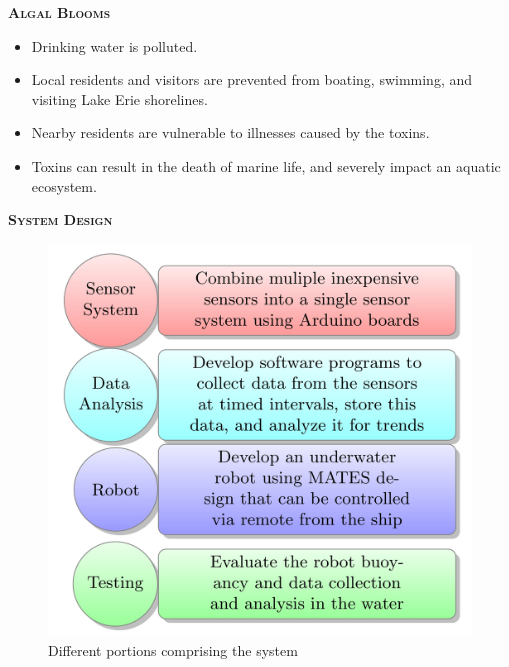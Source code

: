\documentclass[final,t]{beamer}
\begin{document}
\begin{frame}{}
\begin{columns}
\begin{column}{.5\linewidth}
\begin{block}{\textsc{\textbf{Algal Blooms}}}
                \begin{itemize}
               		\item Drinking water is polluted.
					\item Local residents and visitors are prevented from boating, swimming,
          and visiting Lake Erie shorelines.
					\item Nearby residents are vulnerable to illnesses caused by the toxins.
					\item Toxins can result in the death of marine life, and severely impact
          an aquatic ecosystem.
				\end{itemize}
                    \vspace*{3mm}
                \end{block}
                \begin{alertblock}{\textsc{\textbf{System Design}}}
					   \begin{figure}
                    		\includegraphics[scale = 3.84]{assets/diagram.jpg}
                    	\caption{Different portions comprising the system}
                    	\end{figure}
                \end{alertblock}


\end{column}
\end{columns}
\end{frame}
\end{document}
